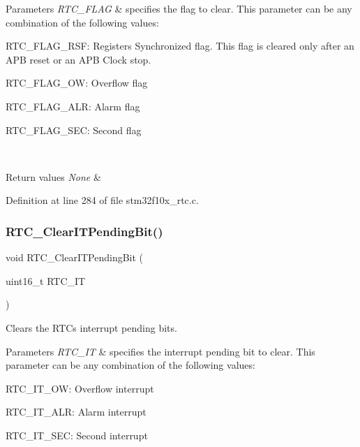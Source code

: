 \begin{DoxyParams}{Parameters}
{\em R\+T\+C\+\_\+\+F\+L\+AG} & specifies the flag to clear. This parameter can be any combination of the following values\+: \begin{DoxyItemize}
\item R\+T\+C\+\_\+\+F\+L\+A\+G\+\_\+\+R\+SF\+: Registers Synchronized flag. This flag is cleared only after an A\+PB reset or an A\+PB Clock stop. \item R\+T\+C\+\_\+\+F\+L\+A\+G\+\_\+\+OW\+: Overflow flag \item R\+T\+C\+\_\+\+F\+L\+A\+G\+\_\+\+A\+LR\+: Alarm flag \item R\+T\+C\+\_\+\+F\+L\+A\+G\+\_\+\+S\+EC\+: Second flag \end{DoxyItemize}
\\
\hline
\end{DoxyParams}

\begin{DoxyRetVals}{Return values}
{\em None} & \\
\hline
\end{DoxyRetVals}


Definition at line 284 of file stm32f10x\+\_\+rtc.\+c.

\mbox{\label{group___r_t_c___private___functions_ga62b9a04d89a11f28db7dcfd50d9ee768}} 
\subsubsection{\texorpdfstring{R\+T\+C\+\_\+\+Clear\+I\+T\+Pending\+Bit()}{RTC\_ClearITPendingBit()}}
{\footnotesize\ttfamily void R\+T\+C\+\_\+\+Clear\+I\+T\+Pending\+Bit (\begin{DoxyParamCaption}\item[{uint16\+\_\+t}]{R\+T\+C\+\_\+\+IT }\end{DoxyParamCaption})}



Clears the R\+TC\textquotesingle{}s interrupt pending bits. 


\begin{DoxyParams}{Parameters}
{\em R\+T\+C\+\_\+\+IT} & specifies the interrupt pending bit to clear. This parameter can be any combination of the following values\+: \begin{DoxyItemize}
\item R\+T\+C\+\_\+\+I\+T\+\_\+\+OW\+: Overflow interrupt \item R\+T\+C\+\_\+\+I\+T\+\_\+\+A\+LR\+: Alarm interrupt \item R\+T\+C\+\_\+\+I\+T\+\_\+\+S\+EC\+: Second interrupt \end{DoxyItemize}
\\
\hline
\end{DoxyParams}

